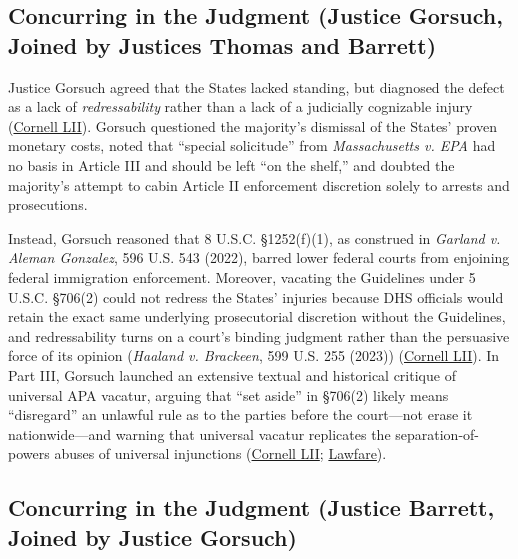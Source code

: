 \documentclass[12pt]{article}
\begin{document}
\subsection{Concurring in the Judgment (Justice Gorsuch, Joined by Justices Thomas and Barrett)}

Justice Gorsuch agreed that the States lacked standing, but diagnosed the defect as a lack of \textit{redressability} rather than a lack of a judicially cognizable injury (\href{https://www.law.cornell.edu/supremecourt/text/22-58}{Cornell LII}). Gorsuch questioned the majority's dismissal of the States' proven monetary costs, noted that ``special solicitude'' from \textit{Massachusetts v. EPA} had no basis in Article III and should be left ``on the shelf,'' and doubted the majority's attempt to cabin Article II enforcement discretion solely to arrests and prosecutions.

Instead, Gorsuch reasoned that 8 U.S.C. \S 1252(f)(1), as construed in \textit{Garland v. Aleman Gonzalez}, 596 U.S. 543 (2022), barred lower federal courts from enjoining federal immigration enforcement. Moreover, vacating the Guidelines under 5 U.S.C. \S 706(2) could not redress the States' injuries because DHS officials would retain the exact same underlying prosecutorial discretion without the Guidelines, and redressability turns on a court's binding judgment rather than the persuasive force of its opinion (\textit{Haaland v. Brackeen}, 599 U.S. 255 (2023)) (\href{https://www.law.cornell.edu/supremecourt/text/22-58}{Cornell LII}). In Part III, Gorsuch launched an extensive textual and historical critique of universal APA vacatur, arguing that ``set aside'' in \S 706(2) likely means ``disregard'' an unlawful rule as to the parties before the court---not erase it nationwide---and warning that universal vacatur replicates the separation-of-powers abuses of universal injunctions (\href{https://www.law.cornell.edu/supremecourt/text/22-58}{Cornell LII}; \href{https://www.lawfaremedia.org/article/united-states-v.-texas-explained}{Lawfare}).

\subsection{Concurring in the Judgment (Justice Barrett, Joined by Justice Gorsuch)}
\end{document}
